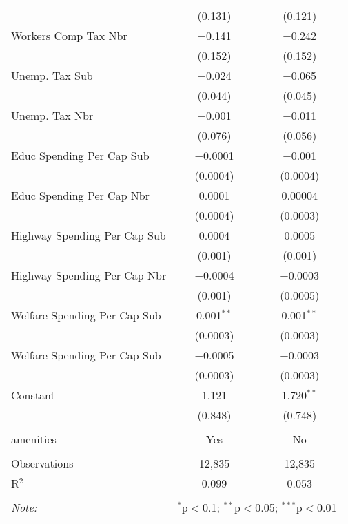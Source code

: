 \begin{table}[!htbp]
\begin{tabular}{@{\extracolsep{5pt}}lcc}
  & (0.131) & (0.121) \\ 
  Workers Comp Tax Nbr & $-$0.141 & $-$0.242 \\ 
  & (0.152) & (0.152) \\ 
  Unemp. Tax Sub & $-$0.024 & $-$0.065 \\ 
  & (0.044) & (0.045) \\ 
  Unemp. Tax Nbr & $-$0.001 & $-$0.011 \\ 
  & (0.076) & (0.056) \\ 
  Educ Spending Per Cap Sub & $-$0.0001 & $-$0.001 \\ 
  & (0.0004) & (0.0004) \\ 
  Educ Spending Per Cap Nbr & 0.0001 & 0.00004 \\ 
  & (0.0004) & (0.0003) \\ 
  Highway Spending Per Cap Sub & 0.0004 & 0.0005 \\ 
  & (0.001) & (0.001) \\ 
  Highway Spending Per Cap Nbr & $-$0.0004 & $-$0.0003 \\ 
  & (0.001) & (0.0005) \\ 
  Welfare Spending Per Cap Sub & 0.001$^{**}$ & 0.001$^{**}$ \\ 
  & (0.0003) & (0.0003) \\ 
  Welfare Spending Per Cap Sub & $-$0.0005 & $-$0.0003 \\ 
  & (0.0003) & (0.0003) \\ 
  Constant & 1.121 & 1.720$^{**}$ \\ 
  & (0.848) & (0.748) \\ 
 \hline \\[-1.8ex] 
amenities & Yes & No \\ 
\hline \\[-1.8ex] 
Observations & 12,835 & 12,835 \\ 
R$^{2}$ & 0.099 & 0.053 \\ 
\hline 
\hline \\[-1.8ex] 
\textit{Note:}  & \multicolumn{2}{r}{$^{*}$p$<$0.1; $^{**}$p$<$0.05; $^{***}$p$<$0.01} \\ 
\end{tabular} 
\end{table} 
